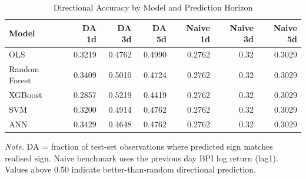 \begin{table}[!ht]
\centering
\begin{threeparttable}
\caption{Directional Accuracy by Model and Prediction Horizon}
\label{tab:eval_da}

\begin{tabular}{lrrrrrr}
\toprule
Model & DA 1d & DA 3d & DA 5d & Naive 1d & Naive 3d & Naive 5d\\
\midrule
OLS & 0.3219 & 0.4762 & 0.4990 & 0.2762 & 0.32 & 0.3029\\
Random Forest & 0.3409 & 0.5010 & 0.4724 & 0.2762 & 0.32 & 0.3029\\
XGBoost & 0.2857 & 0.5219 & 0.4419 & 0.2762 & 0.32 & 0.3029\\
SVM & 0.3200 & 0.4914 & 0.4762 & 0.2762 & 0.32 & 0.3029\\
ANN & 0.3429 & 0.4648 & 0.4762 & 0.2762 & 0.32 & 0.3029\\
\bottomrule
\end{tabular}
\begin{tablenotes}
\footnotesize
\item \textit{Note.} DA = fraction of test-set observations where predicted sign matches realised sign. Naive benchmark uses the previous day BPI log return (lag1). Values above 0.50 indicate better-than-random directional prediction.
\end{tablenotes}
\end{threeparttable}
\end{table}
